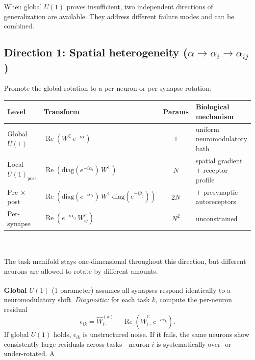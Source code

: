 \documentclass[11pt,a4paper]{article}
\newcommand{\C}{\mathbb{C}}
\newcommand{\Wc}{W^{\mathbb{C}}}
\newcommand{\re}{\operatorname{Re}}
\begin{document}
{When global $U(1)$ proves insufficient, two independent directions 
of generalization are available. They address different failure modes 
and can be combined.

\subsection{Direction 1: Spatial heterogeneity 
($\alpha \to \alpha_i \to \alpha_{ij}$)}

Promote the global rotation to a per-neuron or per-synapse rotation:

\begin{center}
\renewcommand{\arraystretch}{1.3}
\begin{tabular}{@{}llcl@{}}
\toprule
\textbf{Level} & \textbf{Transform} & \textbf{Params} & 
\textbf{Biological mechanism} \\
\midrule
Global $U(1)$ & $\re(\Wc\, e^{-i\alpha})$ & $1$ & 
uniform neuromodulatory bath \\
Local $U(1)_{\text{post}}$ & 
$\re(\text{diag}(e^{-i\alpha_i})\,\Wc)$ & $N$ & 
spatial gradient $+$ receptor profile \\
Pre $\times$ post & 
$\re(\text{diag}(e^{-i\alpha_i})\,\Wc\,
\text{diag}(e^{-i\beta_j}))$ & $2N$ & 
$+$ presynaptic autoreceptors \\
Per-synapse & $\re(e^{-i\alpha_{ij}}\,W_{ij}^{\C})$ & $N^2$ & 
unconstrained \\
\bottomrule
\end{tabular}
\end{center}
\\
\\
The task manifold stays one-dimensional throughout this direction, 
but different neurons are allowed to rotate by different amounts.
\\
\\
\textbf{Global $U(1)$} (1 parameter) assumes all synapses respond 
identically to a neuromodulatory shift. \emph{Diagnostic:} for each 
task $k$, compute the per-neuron residual
\begin{equation}
\epsilon_{ik} = \hat{W}^{(k)}_{i\cdot} 
- \re\!\left(\hat{W}^{\C}_{i\cdot}\, e^{-i\hat{\alpha}_k}\right).
\end{equation}
If global $U(1)$ holds, $\epsilon_{ik}$ is unstructured noise. If 
it fails, the same neurons show consistently large residuals across 
tasks---neuron $i$ is systematically over- or under-rotated. A 
}
\end{document}
